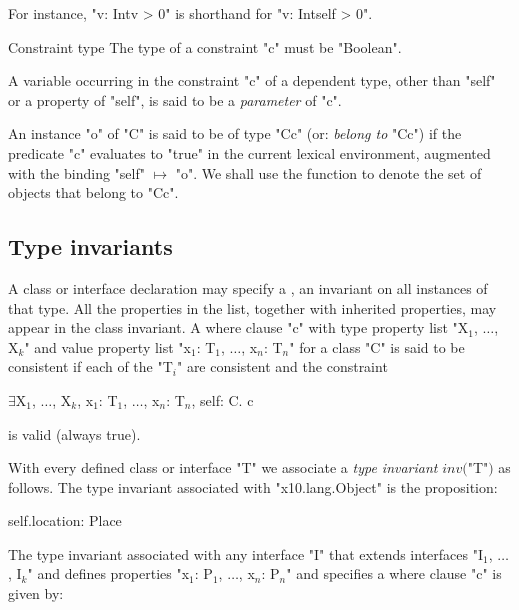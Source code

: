 For instance, \xcd"v: Int{v > 0}" is shorthand for \xcd"v: Int{self > 0}".

\begin{staticrule}{Constraint type}
  The type of a constraint \xcd"c" must be \xcd"Boolean".  
\end{staticrule}

A variable occurring in the constraint \xcd"c" of a dependent type, other than
\xcd"self" or a property of \xcd"self", is said to be a {\em
parameter} of \xcd"c".\label{DepType:Parameter} 

An instance \xcd"o" of \xcd"C" is said to be of type \xcd"C{c}"
(or: {\em belong to}
\xcd"C{c}") if the predicate \xcd"c" evaluates to \xcd"true" in the current lexical
environment, augmented with the binding \xcd"self" $\mapsto$ \xcd"o". We shall
use the function  to denote the set of
objects that belong to \xcd"C{c}". 



\subsection{Type invariants}\label{DepType:TypeInvariant}
\label{DepType:Where}

A class or interface declaration may specify a
, an invariant on all
instances of that type.
All the properties in the list, together with inherited properties,
may appear in the class invariant. A where clause \xcd"c" with
type property list \xcdmath"X$_1$, $\dots$, X$_k$"
and value property list \xcdmath"x$_1$: T$_1$, $\dots$, x$_n$: T$_n$"
for a class \xcd"C" is said to be consistent if each of the \xcdmath"T$_i$" are
consistent and the constraint
\begin{xtenmath}
$\exists$X$_1$, $\dots$, X$_k$, x$_1$: T$_1$, $\dots$, x$_n$: T$_n$, self: C. c
\end{xtenmath}
\noindent is valid (always true).

With every defined class or interface \xcd"T" we associate a {\em type
invariant} $\mathit{inv}($\xcd"T"$)$ as follows. The type
invariant associated with \xcd"x10.lang.Object" is the
proposition:

\begin{xten}
self.location: Place
\end{xten}

The type invariant associated with any interface \xcd"I" that extends
interfaces \xcdmath"I$_1$, $\dots$, I$_k$" and defines properties
\xcdmath"x$_1$: P$_1$, $\dots$, x$_n$: P$_n$" and
specifies a where clause \xcd"c" is given by:

